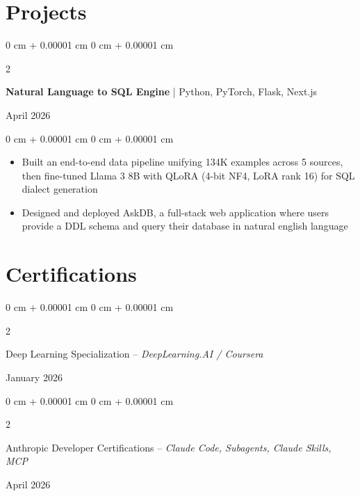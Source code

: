 \documentclass[10pt, letterpaper]{article}
\newenvironment{highlights}{
    \begin{itemize}[
        topsep=0.10 cm,
        parsep=0.10 cm,
        partopsep=0pt,
        itemsep=0pt,
        leftmargin=0 cm + 10pt
    ]
}{
    \end{itemize}
} %
\newenvironment{onecolentry}{
    \begin{adjustwidth}{
        0 cm + 0.00001 cm
    }{
        0 cm + 0.00001 cm
    }
}{
    \end{adjustwidth}
} %
\newenvironment{twocolentry}[2][]{
    \onecolentry
    \def\secondColumn{#2}
    \setcolumnwidth{\fill, 4.5 cm}
    \begin{paracol}{2}
}{
    \switchcolumn \raggedleft \secondColumn
    \end{paracol}
    \endonecolentry
} %
\begin{document}
\section{Projects}

\begin{twocolentry}{
    April 2026
}
\textbf{Natural Language to SQL Engine} | Python, PyTorch, Flask, Next.js
  \end{twocolentry}
  \vspace{0.10 cm}
  \begin{onecolentry}
      \begin{highlights}
  \item Built an end-to-end data pipeline unifying 134K examples across 5 sources, then fine-tuned Llama 3 8B with QLoRA (4-bit NF4, LoRA rank 16) for SQL dialect generation          
  \item Designed and deployed AskDB, a full-stack web application where users provide a DDL schema and query their database in natural english language
      \end{highlights}
  \end{onecolentry}
  \vspace{0.2cm}




\section{Certifications}
\begin{twocolentry}{
    January 2026
}
Deep Learning Specialization – \textit{DeepLearning.AI / Coursera}
\end{twocolentry}
\begin{twocolentry}{
    April 2026
}
Anthropic Developer Certifications – \textit{Claude Code, Subagents, Claude Skills, MCP}
\end{twocolentry}
\end{document}
